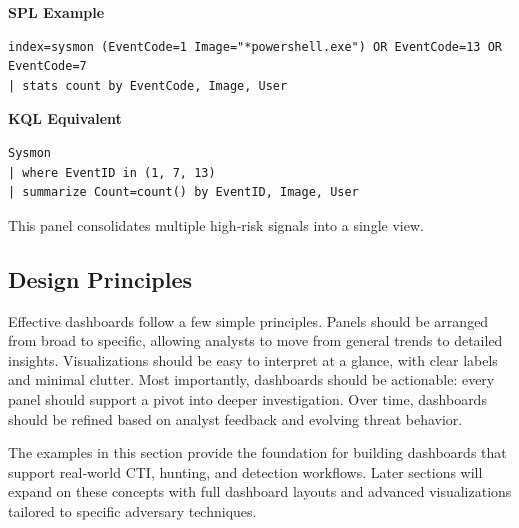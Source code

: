 \textbf{SPL Example}
\begin{lstlisting}
index=sysmon (EventCode=1 Image="*powershell.exe") OR EventCode=13 OR EventCode=7
| stats count by EventCode, Image, User
\end{lstlisting}

\textbf{KQL Equivalent}
\begin{lstlisting}
Sysmon
| where EventID in (1, 7, 13)
| summarize Count=count() by EventID, Image, User
\end{lstlisting}

This panel consolidates multiple high‑risk signals into a single view.

\subsection*{Design Principles}

Effective dashboards follow a few simple principles. Panels should be arranged from broad to specific, allowing analysts to 
move from general trends to detailed insights. Visualizations should be easy to interpret at a glance, with clear labels and 
minimal clutter. Most importantly, dashboards should be actionable: every panel should support a pivot into deeper investigation. 
Over time, dashboards should be refined based on analyst feedback and evolving threat behavior.

The examples in this section provide the foundation for building dashboards that support real‑world CTI, hunting, and detection 
workflows. Later sections will expand on these concepts with full dashboard layouts and advanced visualizations tailored to 
specific adversary techniques.
